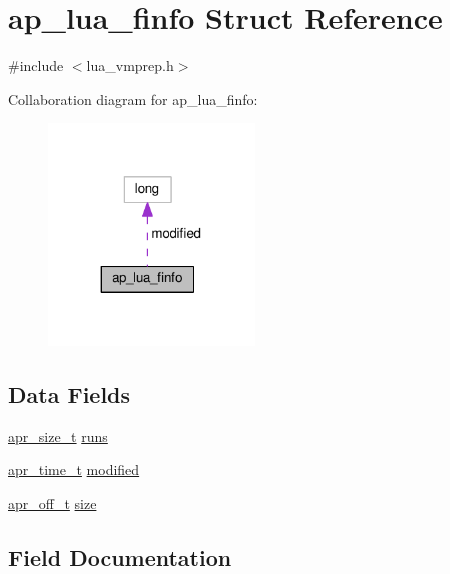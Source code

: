 \hypertarget{structap__lua__finfo}{}\section{ap\+\_\+lua\+\_\+finfo Struct Reference}
\label{structap__lua__finfo}


{\ttfamily \#include $<$lua\+\_\+vmprep.\+h$>$}



Collaboration diagram for ap\+\_\+lua\+\_\+finfo\+:
\nopagebreak
\begin{figure}[H]
\begin{center}
\leavevmode
\includegraphics[width=155pt]{structap__lua__finfo__coll__graph}
\end{center}
\end{figure}
\subsection*{Data Fields}
\begin{DoxyCompactItemize}
\item 
\hyperlink{group__apr__platform_gaaa72b2253f6f3032cefea5712a27540e}{apr\+\_\+size\+\_\+t} \hyperlink{structap__lua__finfo_a579b5cb9299631a471316e8edda02dd7}{runs}
\item 
\hyperlink{group__apr__time_gadb4bde16055748190eae190c55aa02bb}{apr\+\_\+time\+\_\+t} \hyperlink{structap__lua__finfo_a437d7d7c91addc2a66eb54b1a1799e41}{modified}
\item 
\hyperlink{group__apr__platform_ga6938af9075cec15c88299109381aa984}{apr\+\_\+off\+\_\+t} \hyperlink{structap__lua__finfo_a6b961c0cc6d0b56637da657c03819457}{size}
\end{DoxyCompactItemize}


\subsection{Field Documentation}
